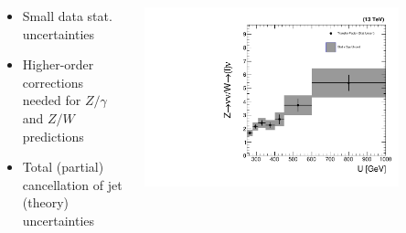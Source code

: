 \documentclass[aspectratio=169,xcolor=dvipsnames,,table,compress]{beamer}
\begin{document}
\begin{frame}
\begin{columns}
\begin{column}{0.3\textwidth}
    \end{column}
  \end{columns}
  \begin{columns}[T]
    \begin{column}{0.7\textwidth}
      \begin{itemize}
        \item Small data stat. uncertainties
        \item Higher-order corrections needed for $Z/\gamma$ and $Z/W$ predictions 
        \item Total (partial) cancellation of jet (theory) uncertainties
      \end{itemize}
    \end{column}
    \begin{column}{0.3\textwidth}
      \vspace{-6.5mm}
      \includegraphics[width=0.8\textwidth]{../figures/monotop/xfer/rfactor_wz.pdf}
    \end{column}
  \end{columns}
\end{frame}
\end{document}
